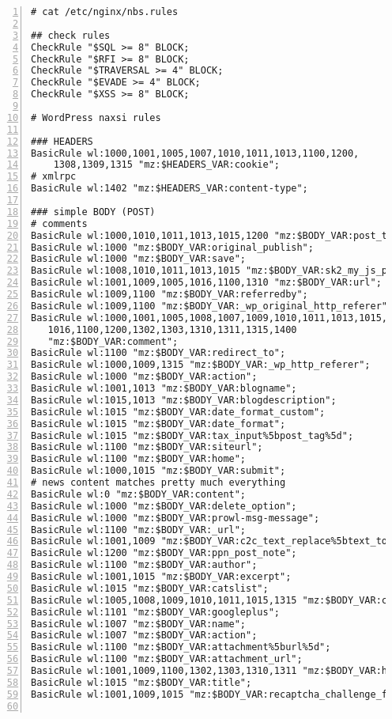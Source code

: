 \documentclass[Configuration]{subfiles}
\begin{document}
\begin{lstlisting}[frame=single,caption=Wordpress whitelist rules,backgroundcolor=\color{gray},breaklines=true,numbers=left,]
# cat /etc/nginx/nbs.rules

## check rules
CheckRule "$SQL >= 8" BLOCK;
CheckRule "$RFI >= 8" BLOCK;
CheckRule "$TRAVERSAL >= 4" BLOCK;
CheckRule "$EVADE >= 4" BLOCK;
CheckRule "$XSS >= 8" BLOCK;

# WordPress naxsi rules

### HEADERS
BasicRule wl:1000,1001,1005,1007,1010,1011,1013,1100,1200,
	1308,1309,1315 "mz:$HEADERS_VAR:cookie";
# xmlrpc
BasicRule wl:1402 "mz:$HEADERS_VAR:content-type";

### simple BODY (POST)
# comments
BasicRule wl:1000,1010,1011,1013,1015,1200 "mz:$BODY_VAR:post_title";
BasicRule wl:1000 "mz:$BODY_VAR:original_publish";
BasicRule wl:1000 "mz:$BODY_VAR:save";
BasicRule wl:1008,1010,1011,1013,1015 "mz:$BODY_VAR:sk2_my_js_payload";
BasicRule wl:1001,1009,1005,1016,1100,1310 "mz:$BODY_VAR:url";
BasicRule wl:1009,1100 "mz:$BODY_VAR:referredby";
BasicRule wl:1009,1100 "mz:$BODY_VAR:_wp_original_http_referer";
BasicRule wl:1000,1001,1005,1008,1007,1009,1010,1011,1013,1015,
   1016,1100,1200,1302,1303,1310,1311,1315,1400 
   "mz:$BODY_VAR:comment";
BasicRule wl:1100 "mz:$BODY_VAR:redirect_to";
BasicRule wl:1000,1009,1315 "mz:$BODY_VAR:_wp_http_referer";
BasicRule wl:1000 "mz:$BODY_VAR:action";
BasicRule wl:1001,1013 "mz:$BODY_VAR:blogname";
BasicRule wl:1015,1013 "mz:$BODY_VAR:blogdescription";
BasicRule wl:1015 "mz:$BODY_VAR:date_format_custom";
BasicRule wl:1015 "mz:$BODY_VAR:date_format";
BasicRule wl:1015 "mz:$BODY_VAR:tax_input%5bpost_tag%5d";
BasicRule wl:1100 "mz:$BODY_VAR:siteurl";
BasicRule wl:1100 "mz:$BODY_VAR:home";
BasicRule wl:1000,1015 "mz:$BODY_VAR:submit";
# news content matches pretty much everything
BasicRule wl:0 "mz:$BODY_VAR:content";
BasicRule wl:1000 "mz:$BODY_VAR:delete_option";
BasicRule wl:1000 "mz:$BODY_VAR:prowl-msg-message";
BasicRule wl:1100 "mz:$BODY_VAR:_url";
BasicRule wl:1001,1009 "mz:$BODY_VAR:c2c_text_replace%5btext_to_replace%5d";
BasicRule wl:1200 "mz:$BODY_VAR:ppn_post_note";
BasicRule wl:1100 "mz:$BODY_VAR:author";
BasicRule wl:1001,1015 "mz:$BODY_VAR:excerpt";
BasicRule wl:1015 "mz:$BODY_VAR:catslist";
BasicRule wl:1005,1008,1009,1010,1011,1015,1315 "mz:$BODY_VAR:cookie";
BasicRule wl:1101 "mz:$BODY_VAR:googleplus";
BasicRule wl:1007 "mz:$BODY_VAR:name";
BasicRule wl:1007 "mz:$BODY_VAR:action";
BasicRule wl:1100 "mz:$BODY_VAR:attachment%5burl%5d";
BasicRule wl:1100 "mz:$BODY_VAR:attachment_url";
BasicRule wl:1001,1009,1100,1302,1303,1310,1311 "mz:$BODY_VAR:html";
BasicRule wl:1015 "mz:$BODY_VAR:title";
BasicRule wl:1001,1009,1015 "mz:$BODY_VAR:recaptcha_challenge_field";


\end{lstlisting}
\end{document}
